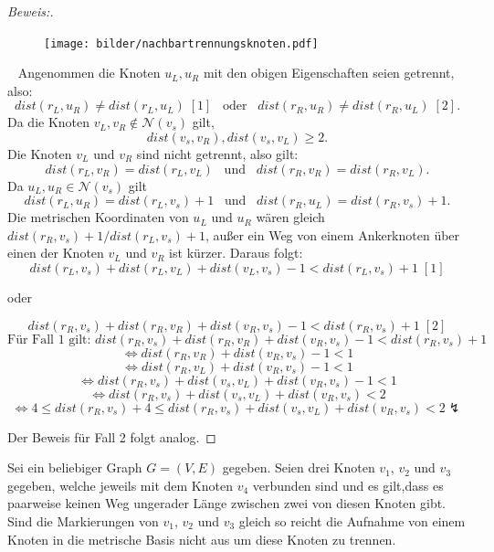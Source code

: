 \begin{proof}[Beweis:]~\newline
\begin{figure}[!h]
\centering
\texttt{[image: bilder/nachbartrennungsknoten.pdf]}
\end{figure}
~\linebreak
Angenommen die Knoten $u_L,u_R$ mit den obigen Eigenschaften seien getrennt, also: $$dist(r_L,u_R)\neq dist(r_L,u_L)\; [1]\;\;\; \text{oder}\;\;\; dist(r_R,u_R)\neq dist(r_R,u_L)\; [2].$$
  Da die Knoten $v_L, v_R \notin \mathcal{N}(v_s)$ gilt, $$dist(v_s,v_R),dist(v_s,v_L)\geq 2.$$ Die Knoten $v_L$ und $v_R$ sind nicht getrennt, also gilt: $$dist(r_L,v_R)=dist(r_L,v_L)\;\;\; \text{und}\;\;\; dist(r_R,v_R)=dist(r_R,v_L).$$ Da $u_L,u_R \in \mathcal{N}(v_s)$ gilt $$dist(r_L,u_R)=dist(r_L,v_s)+1\;\;\; \text{und}\;\;\;dist(r_R,u_L)=dist(r_R,v_s)+1.$$   
Die metrischen Koordinaten von $u_L$ und $u_R$ wären gleich $dist(r_R,v_s)+1/dist(r_L,v_s)+1$, außer ein Weg von einem Ankerknoten über einen der Knoten $v_L$ und $v_R$ ist kürzer. Daraus folgt: $$dist(r_L,v_s)+dist(r_L,v_L)+dist(v_L,v_s)-1< dist(r_L,v_s)+1\;[1]$$ \begin{center} oder  \end{center}$$dist(r_R,v_s)+dist(r_R,v_R)+dist(v_R,v_s)-1< dist(r_R,v_s)+1\;[2]$$ \vspace{+2mm}
  $$\text{Für Fall 1 gilt: } dist(r_R,v_s)+dist(r_R,v_R)+dist(v_R,v_s)-1< dist(r_R,v_s)+1$$
  $$\Leftrightarrow dist(r_R,v_R)+dist(v_R,v_s)-1< 1$$
  $$\Leftrightarrow dist(r_R,v_L)+dist(v_R,v_s)-1< 1$$
  $$\Leftrightarrow dist(r_R,v_s)+ dist(v_s,v_L)+dist(v_R,v_s)-1 < 1$$
  $$\Leftrightarrow dist(r_R,v_s)+dist(v_s,v_L)+dist(v_R,v_s)< 2$$
  $$\Leftrightarrow  4 \leq dist(r_R,v_s) +4 \leq dist(r_R,v_s)+dist(v_s,v_L)+dist(v_R,v_s)< 2 \lightning$$

Der Beweis für Fall 2 folgt analog. 
  \end{proof}
\begin{lem}
\label{einelementreichtnicht}
Sei ein beliebiger Graph $G=(V,E)$ gegeben. Seien drei Knoten $v_1$, $v_2$ und $v_3$ gegeben, welche jeweils mit dem Knoten $v_4$ verbunden sind und es gilt,dass es paarweise keinen Weg ungerader Länge zwischen zwei von diesen Knoten gibt. Sind die Markierungen von $v_1$, $v_2$ und $v_3$ gleich so reicht die Aufnahme von einem Knoten in die metrische Basis nicht aus um diese Knoten zu trennen.
\end{lem}
